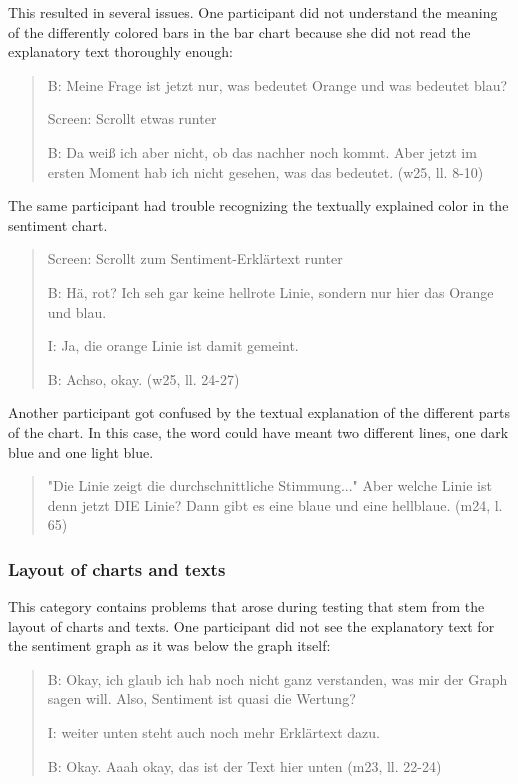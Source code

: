 This resulted in several issues. One participant did not understand the meaning of the differently colored bars in the bar chart because she did not read the explanatory text thoroughly enough:

\begin{quote}
    B: Meine Frage ist jetzt nur, was bedeutet Orange und was bedeutet blau? 

    Screen: Scrollt etwas runter

    B: Da weiß ich aber nicht, ob das nachher noch kommt. Aber jetzt im ersten Moment hab ich nicht gesehen, was das bedeutet. (w25, ll. 8-10)
\end{quote}

The same participant had trouble recognizing the textually explained color in the sentiment chart.

\begin{quote}
    Screen: Scrollt zum Sentiment-Erklärtext runter

    B: Hä, rot? Ich seh gar keine hellrote Linie, sondern nur hier das Orange und blau.

    I: Ja, die orange Linie ist damit gemeint.

    B: Achso, okay. (w25, ll. 24-27)
\end{quote}

Another participant got confused by the textual explanation of the different parts of the chart. In this case, the word  could have meant two different lines, one dark blue and one light blue.

\begin{quote}
    "Die Linie zeigt die durchschnittliche Stimmung..." Aber welche Linie ist denn jetzt DIE Linie? Dann gibt es eine blaue und eine hellblaue. (m24, l. 65)
\end{quote}

\subsubsection*{Layout of charts and texts}
This category contains problems that arose during testing that stem from the layout of charts and texts. One participant did not see the explanatory text for the sentiment graph as it was below the graph itself:

\begin{quote}
    B: Okay, ich glaub ich hab noch nicht ganz verstanden, was mir der Graph sagen will. Also, Sentiment ist quasi die Wertung?

    I: weiter unten steht auch noch mehr Erklärtext dazu.

    B: Okay. Aaah okay, das ist der Text hier unten (m23, ll. 22-24)
\end{quote}

